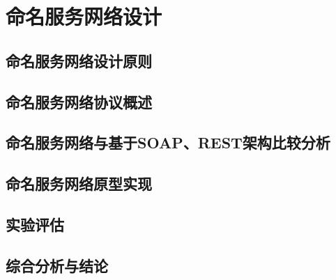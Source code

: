 

\chapter{命名服务网络设计}
\section{命名服务网络设计原则}
\section{命名服务网络协议概述}
\section{命名服务网络与基于SOAP、REST架构比较分析}
\section{命名服务网络原型实现}
\section{实验评估}
\section{综合分析与结论}